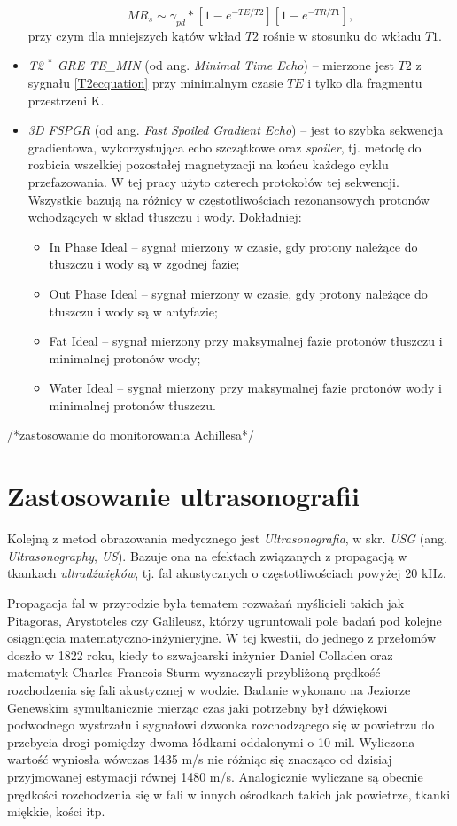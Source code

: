 \begin{itemize}
\begin{equation}
	MR_s \sim \gamma_{pd} \ast [1-e^{-TE/T2}][1-e^{-TR/T1}],
	\end{equation}
	przy czym dla mniejszych kątów wkład $T2$ rośnie w stosunku do wkładu $T1$.
	\item \textit{T2 $^\ast$ GRE TE\_MIN} (od ang. \textit{Minimal Time Echo}) -- mierzone jest $T2$ z sygnału \ref{T2ecquation} przy minimalnym czasie $TE$ i tylko dla fragmentu przestrzeni K. 
	\item \textit{3D FSPGR} (od ang. \textit{Fast Spoiled Gradient Echo}) -- jest to szybka sekwencja gradientowa, wykorzystująca echo szczątkowe oraz \textit{spoiler}, tj. metodę do rozbicia wszelkiej pozostałej magnetyzacji na końcu każdego cyklu przefazowania. W tej pracy użyto czterech protokołów tej sekwencji. Wszystkie bazują na różnicy w częstotliwościach rezonansowych protonów wchodzących w skład tłuszczu i wody. Dokładniej:
	\begin{itemize}
		\item In Phase Ideal -- sygnał mierzony w czasie, gdy protony należące do tłuszczu i wody są w zgodnej fazie;
		\item Out Phase Ideal -- sygnał mierzony w czasie, gdy protony należące do tłuszczu i wody są w antyfazie;
		\item Fat Ideal -- sygnał mierzony przy maksymalnej fazie protonów tłuszczu i minimalnej protonów wody;
		\item Water Ideal -- sygnał mierzony przy maksymalnej fazie protonów wody i minimalnej protonów tłuszczu.
	\end{itemize}
\end{itemize}

/*zastosowanie do monitorowania Achillesa*/

\section{Zastosowanie ultrasonografii}

Kolejną z metod obrazowania medycznego jest \textit{Ultrasonografia}, w skr. \textit{USG} (ang. \textit{Ultrasonography}, \textit{US}). Bazuje ona na efektach związanych z propagacją w tkankach \textit{ultradźwięków}, tj. fal akustycznych o częstotliwościach powyżej 20 kHz.

Propagacja fal w przyrodzie była tematem rozważań myślicieli takich jak Pitagoras, Arystoteles czy Galileusz, którzy ugruntowali pole badań pod kolejne osiągnięcia matematyczno-inżynieryjne. W tej kwestii, do jednego z przełomów doszło w 1822 roku, kiedy to szwajcarski inżynier Daniel Colladen oraz matematyk Charles-Francois Sturm wyznaczyli przybliżoną prędkość rozchodzenia się fali akustycznej w wodzie. Badanie wykonano na Jeziorze Genewskim symultanicznie mierząc czas jaki potrzebny był dźwiękowi podwodnego wystrzału i sygnałowi dzwonka rozchodzącego się w powietrzu do przebycia drogi pomiędzy dwoma łódkami oddalonymi o 10 mil. Wyliczona wartość wyniosła wówczas 1435 m/s nie różniąc się znacząco od dzisiaj przyjmowanej estymacji równej 1480 m/s. Analogicznie wyliczane są obecnie prędkości rozchodzenia się w fali w innych ośrodkach takich jak powietrze, tkanki miękkie, kości itp.

